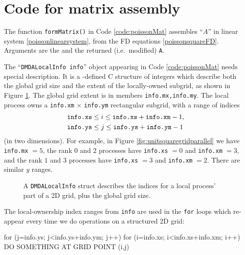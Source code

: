 \section{Code for matrix assembly}

The function \texttt{formMatrix()} in Code \ref{code:poissonMat} assembles ``$A$'' in linear system \eqref{poissonlinearsystem}, from the FD equations \eqref{poissonsquareFD}.  Arguments are the \pDM and the returned (i.e.~modified) \pMat \texttt{A}.


The ``\texttt{DMDALocalInfo info}'' object appearing in Code \ref{code:poissonMat} needs special description.  It is a \PETSc-defined C structure of integers which describe both the global grid size and the extent of the locally-owned subgrid, as shown in Figure \ref{fig:localpartofgrid}.  The global grid extent is in members \texttt{info.mx,info.my}.  The local process owns a \texttt{info.xm} $\times$ \texttt{info.ym} rectangular subgrid, with a range of indices
\begin{align*}
&\text{\texttt{info.xs}} \le i \le \text{\texttt{info.xs}} +\text{\texttt{info.xm}}-1, \\
&\text{\texttt{info.ys}} \le j \le \text{\texttt{info.ys}} +\text{\texttt{info.ym}}-1
\end{align*}
(in two dimensions).  For example, in Figure \ref{fig:unitsquaregridparallel} we have \texttt{info.mx} $=5$, the rank $0$ and $2$ processes have \texttt{info.xs} $=0$ and \texttt{info.xm} $=3$, and the rank $1$ and $3$ processes have \texttt{info.xs} $=3$ and \texttt{info.xm} $=2$.  There are similar $y$ ranges.

\begin{figure}

\caption{A \texttt{DMDALocalInfo} struct describes the indices for a local process' part of a 2D grid, plus the global grid size.}
\label{fig:localpartofgrid}
\end{figure}

The local-ownership index ranges from \texttt{info} are used in the \texttt{for} loops which re-appear every time we do operations on a structured 2D grid:
\begin{code}
for (j=info.ys; j<info.ys+info.ym; j++) {
  for (i=info.xs; i<info.xs+info.xm; i++) {
    DO SOMETHING AT GRID POINT (i,j)
  }
}
\end{code}

